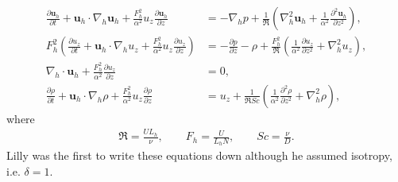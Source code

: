\begin{align}
\frac{\partial \textbf{u}_{h}}{\partial t} + \textbf{u}_{h}\cdot\nabla_{h}\textbf{u}_{h}+\frac{F_{h}^{2}}{\alpha^{2}}u_{z}\frac{\partial \textbf{u}_{h}}{\partial z} &= -\nabla_{h}p + \frac{1}{\Re}\left(\nabla^{2}_{h}\textbf{u}_{h}+\frac{1}{\alpha^{2}}\frac{\partial^{2}\textbf{u}_{h}}{\partial z^{2}}\right),\\
F_{h}^{2}\left(\frac{\partial u_{z}}{\partial t} + \textbf{u}_{h}\cdot\nabla_{h}u_{z}+\frac{F_{h}^{2}}{\alpha^{2}}u_{z}\frac{\partial u_{z}}{\partial z}\right) &= -\frac{\partial p}{\partial z} - \rho + \frac{F_{h}^{2}}{\Re}\left(\frac{1}{\alpha^{2}}\frac{\partial u_{z}}{\partial z^{2}} + \nabla^{2}_{h}u_{z}\right),\\
\nabla_{h}\cdot\textbf{u}_{h} + \frac{F_{h}^{2}}{\alpha^{2}}\frac{\partial u_{z}}{\partial z} &=0,\\
\frac{\partial \rho}{\partial t} + \textbf{u}_{h}\cdot\nabla_{h}\rho + \frac{F_{h}^{2}}{\alpha^{2}}u_{z}\frac{\partial \rho}{\partial z} &= u_{z} + \frac{1}{\Re Sc}\left(\frac{1}{\alpha^{2}}\frac{\partial^{2}\rho}{\partial z^{2}} + \nabla^{2}_{h}\rho\right),
\end{align} 
where 
\begin{align}
\Re = \frac{UL_{h}}{\nu}, \qquad F_{h} = \frac{U}{L_{h}N},\qquad Sc = \frac{\nu}{D}.
\end{align}
Lilly was the first to write these equations down although he assumed isotropy, i.e. $\delta=1$. 

